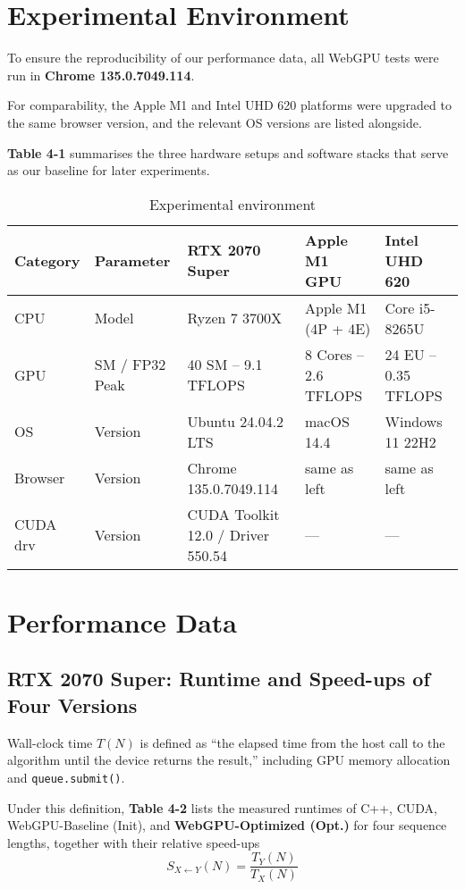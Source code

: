\documentclass[12pt]{report}
\begin{document}
\section{Experimental Environment}
To ensure the reproducibility of our performance data, all WebGPU tests were run in \textbf{Chrome 135.0.7049.114}.

For comparability, the Apple M1 and Intel UHD 620 platforms were upgraded to the same browser version, and the relevant OS versions are listed alongside.

\textbf{Table 4-1} summarises the three hardware setups and software stacks that serve as our baseline for later experiments.

\begin{table}[h]
    \centering
    \begin{tabularx}{\textwidth}{|X|X|X|X|}
        \hline
        Category & Parameter & RTX 2070 Super & Apple M1 GPU & Intel UHD 620 \\
        \hline
        CPU & Model & Ryzen 7 3700X & Apple M1 (4P + 4E) & Core i5-8265U \\
        GPU & SM / FP32 Peak & 40 SM – 9.1 TFLOPS & 8 Cores – 2.6 TFLOPS & 24 EU – 0.35 TFLOPS \\
        OS & Version & Ubuntu 24.04.2 LTS & macOS 14.4 & Windows 11 22H2 \\
        Browser & Version & Chrome 135.0.7049.114 & same as left & same as left \\
        CUDA drv & Version & CUDA Toolkit 12.0 / Driver 550.54 & — & — \\
        \hline
    \end{tabularx}
    \caption{Experimental environment}
    \label{tab:exp_env}
\end{table}

\section{Performance Data}
\subsection{RTX 2070 Super: Runtime and Speed-ups of Four Versions}
Wall-clock time $T(N)$ is defined as ``the elapsed time from the host call to the algorithm until the device returns the result,'' including GPU memory allocation and \texttt{queue.submit()}.

Under this definition, \textbf{Table 4-2} lists the measured runtimes of C++, CUDA, WebGPU-Baseline (Init), and \textbf{WebGPU-Optimized (Opt.)} for four sequence lengths, together with their relative speed-ups
\[
S_{X \leftarrow Y}(N) = \frac{T_Y(N)}{T_X(N)}
\]
\end{document}
